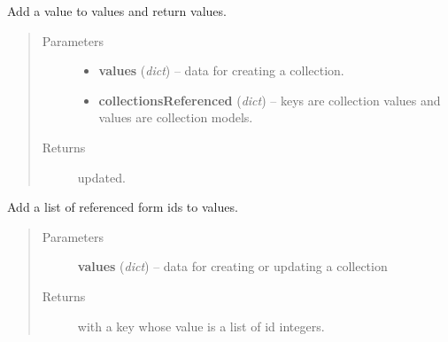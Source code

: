 \documentclass[letterpaper,10pt,english]{sphinxmanual}
\begin{document}
\begin{fulllineitems}
\label{api:onlinelinguisticdatabase.controllers.oldcollections.addContentsUnpackedToValues}
Add a  value to values and return values.
\begin{quote}\begin{description}
\item[{Parameters}] \leavevmode\begin{itemize}
\item {} 
\textbf{values} (\emph{dict}) -- data for creating a collection.

\item {} 
\textbf{collectionsReferenced} (\emph{dict}) -- keys are collection  values and 
values are collection models.

\end{itemize}

\item[{Returns}] \leavevmode
{} updated.

\end{description}\end{quote}

\end{fulllineitems}


\begin{fulllineitems}
\label{api:onlinelinguisticdatabase.controllers.oldcollections.addFormIdsListToValues}
Add a list of referenced form ids to values.
\begin{quote}\begin{description}
\item[{Parameters}] \leavevmode
\textbf{values} (\emph{dict}) -- data for creating or updating a collection

\item[{Returns}] \leavevmode
{} with a  key whose value is a list of id integers.

\end{description}\end{quote}

\end{fulllineitems}
\end{document}
